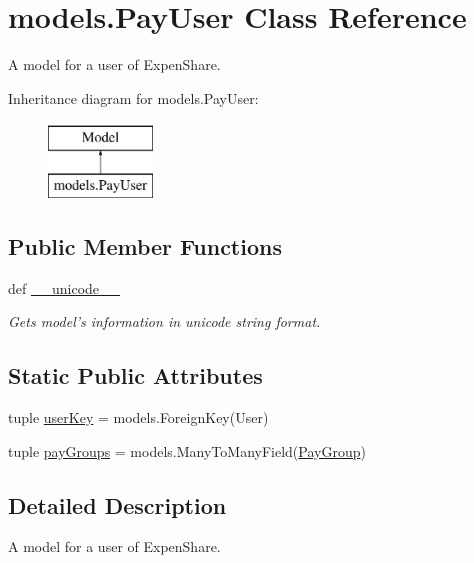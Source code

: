 \hypertarget{classmodels_1_1_pay_user}{\section{models.\-Pay\-User Class Reference}
\label{classmodels_1_1_pay_user}
}


A model for a user of Expen\-Share.  


Inheritance diagram for models.\-Pay\-User\-:\begin{figure}[H]
\begin{center}
\leavevmode
\includegraphics[height=2.000000cm]{classmodels_1_1_pay_user}
\end{center}
\end{figure}
\subsection*{Public Member Functions}
\begin{DoxyCompactItemize}
\item 
def \hyperlink{classmodels_1_1_pay_user_ac491f89a0df97a08ac1f83d1f34e4dfe}{\-\_\-\-\_\-unicode\-\_\-\-\_\-}
\begin{DoxyCompactList}\small\item\em Gets model's information in unicode string format. \end{DoxyCompactList}\end{DoxyCompactItemize}
\subsection*{Static Public Attributes}
\begin{DoxyCompactItemize}
\item 
tuple \hyperlink{classmodels_1_1_pay_user_aa76f651fc85e89f9f366dec5aa0387da}{user\-Key} = models.\-Foreign\-Key(User)
\item 
tuple \hyperlink{classmodels_1_1_pay_user_a719a310f020d573098ebecca7497ba2d}{pay\-Groups} = models.\-Many\-To\-Many\-Field(\hyperlink{classmodels_1_1_pay_group}{Pay\-Group})
\end{DoxyCompactItemize}


\subsection{Detailed Description}
A model for a user of Expen\-Share. 

